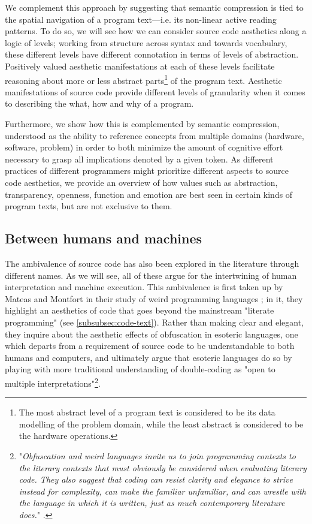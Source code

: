We complement this approach by suggesting that semantic compression is tied to the spatial navigation of a program text—i.e. its non-linear active reading patterns. To do so, we will see how we can consider source code aesthetics along a logic of levels; working from structure across syntax and towards vocabulary, these different levels have different connotation in terms of levels of abstraction. Positively valued aesthetic manifestations at each of these levels facilitate reasoning about more or less abstract parts\footnote{The most abstract level of a program text is considered to be its data modelling of the problem domain, while the least abstract is considered to be the hardware operations.} of the program text. Aesthetic manifestations of source code provide different levels of granularity when it comes to describing the what, how and why of a program.

Furthermore, we show how this is complemented by semantic compression, understood as the ability to reference concepts from multiple domains (hardware, software, problem) in order to both minimize the amount of cognitive effort necessary to grasp all implications denoted by a given token. As different practices of different programmers might prioritize different aspects to source code aesthetics, we provide an overview of how values such as abstraction, transparency, openness, function and emotion are best seen in certain kinds of program texts, but are not exclusive to them.

\subsection{Between humans and machines}
\label{subsec:humans-machines}

The ambivalence of source code has also been explored in the literature through different names. As we will see, all of these argue for the intertwining of human interpretation and machine execution. This ambivalence is first taken up by Mateas and Montfort in their study of weird programming languages \citep{mateas_box_2005}; in it, they highlight an aesthetics of code that goes beyond the mainstream "literate programming" (see \autoref{subsubsec:code-text}). Rather than making clear and elegant, they inquire about the aesthetic effects of obfuscation in esoteric languages, one which departs from a requirement of source code to be understandable to both humans and computers, and ultimately argue that esoteric languages do so by playing with more traditional understanding of double-coding as "open to multiple interpretations"\footnote{"\emph{Obfuscation and weird languages invite us to join programming contexts to the literary contexts that must obviously be considered when evaluating literary code. They also suggest that coding can resist clarity and elegance to strive instead for complexity, can make the familiar unfamiliar, and can wrestle with the language in which it is written, just as much contemporary literature does.}" \citep{mateas_box_2005}.}.


